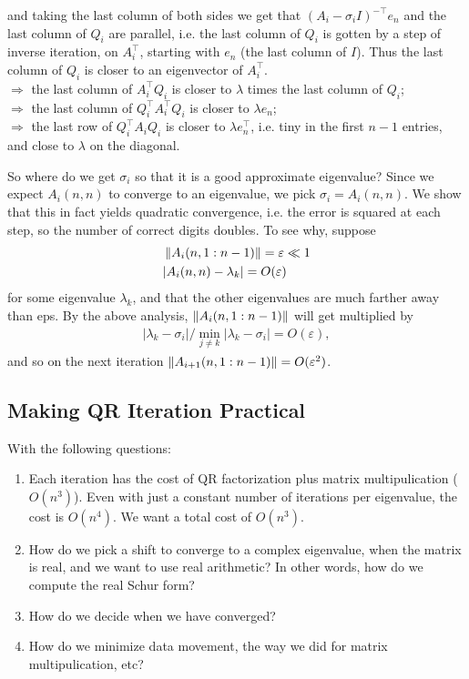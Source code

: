 \documentclass[11pt]{article}
\numberwithin{equation}{section}
\begin{document}
and taking the last column of both sides we get that $\left(A_{i}-\sigma_{i} I\right)^{-\top} e_n$ and the last column of $Q_i$ are parallel, 
i.e. the last column of $Q_i$ is gotten by a step of inverse iteration, on $A_i^\top$, starting with $e_n$ (the last column of $I$).
Thus the last column of $Q_i$ is closer to an eigenvector of $A_i^\top$.\\
$\Rightarrow$ the last column of $A_i^\top Q_i$ is closer to $\lambda$ times the last column of $Q_i$;\\
$\Rightarrow$ the last column of $Q_i^\top A_i^\top Q_i$ is closer to $\lambda e_n$;\\
$\Rightarrow$ the last row of $Q_i^\top A_i Q_i$ is closer to $\lambda e_n^\top$, i.e. tiny in the first $n-1$ entries, and close to $\lambda$ on the diagonal.

So where do we get $\sigma_{i}$ so that it is a good approximate eigenvalue? Since we expect $A_i(n,n)$ to converge to an eigenvalue, we pick $\sigma_{i}=A_i(n,n)$.
We show that this in fact yields quadratic convergence, i.e. the error is squared at each step, so the number of correct digits doubles. To see why, 
suppose \begin{align*}
    &\left\| A_i(n,1:n-1) \right\| = \varepsilon \ll 1 \\
    &|A_i(n,n) - \lambda_k| = O(\varepsilon)
\end{align*}
for some eigenvalue $\lambda_k$, and that the other eigenvalues are much farther away than eps.
By the above analysis, $\left\| A_i(n,1:n-1) \right\|$ will get multiplied by \begin{align*}
    | \lambda_k - \sigma_{i} | / \min_{j \neq k} | \lambda_k - \sigma_{i} | = O(\varepsilon),
\end{align*}
and so on the next iteration $\left\| A_{i+1}(n,1:n-1) \right\| = O(\varepsilon^2)$.

\subsection{Making QR Iteration Practical}
With the following questions:
\begin{enumerate}
    \item Each iteration has the cost of QR factorization plus matrix multipulication ($O(n^3)$). Even with just a constant number of iterations per eigenvalue, 
    the cost is $O(n^4)$. We want a total cost of $O(n^3)$.
    \item How do we pick a shift to converge to a complex eigenvalue, when the matrix is real, and we want to use real arithmetic? In other words, 
    how do we compute the real Schur form?
    \item How do we decide when we have converged?
    \item How do we minimize data movement, the way we did for matrix multipulication, etc?
\end{enumerate}
\end{document}
